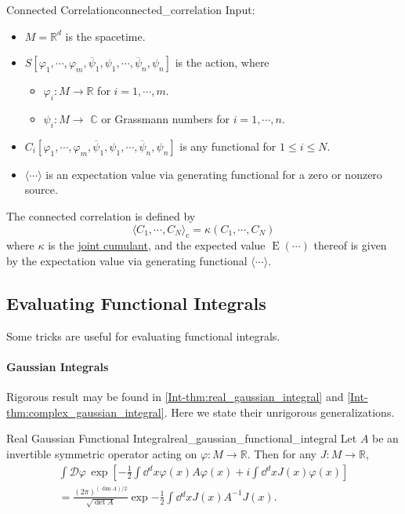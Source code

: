 \documentclass{article}
\begin{document}
\begin{definition}{Connected Correlation}{connected_correlation}
    Input:
    \begin{itemize}[nosep]
        \item $M = \mathbb{R}^{d}$ is the spacetime.
        \item $S[\varphi_1, \cdots, \varphi_m, \overline{\psi}_1,\psi_1,\cdots,\overline{\psi}_n,\psi_n]$ is the action, where
        \begin{itemize}[nosep]
            \item $\varphi_i: M \rightarrow \mathbb{R}$ for $i = 1,\cdots,m$.
            \item $\psi_i: M \rightarrow$ $\mathbb{C}$ or Grassmann numbers for $i = 1,\cdots, n$.
        \end{itemize}
        \item $C_i[\varphi_1, \cdots, \varphi_m, \overline{\psi}_1,\psi_1,\cdots,\overline{\psi}_n,\psi_n]$ is any functional for $1\le i \le N$.
        \item $\langle \cdots \rangle$ is an expectation value via generating functional for a zero or nonzero source.
    \end{itemize}
    The connected correlation is defined by
    \[ \langle C_1, \cdots, C_N \rangle_{\mathrm{c}} = \kappa(C_1,\cdots,C_N) \]
    where $\kappa$ is the \href{https://en.wikipedia.org/wiki/Cumulant#Joint_cumulants}{joint cumulant}, and the expected value $\operatorname{E}({\cdots})$ thereof is given by the expectation value via generating functional $\langle {\cdots} \rangle$.
\end{definition}

\subsection{Evaluating Functional Integrals}

Some tricks are useful for evaluating functional integrals.

\paragraph*{Gaussian Integrals}
Rigorous result may be found in \cref{Int-thm:real_gaussian_integral} and \cref{Int-thm:complex_gaussian_integral}.
Here we state their unrigorous generalizations.

\begin{theorem}{Real Gaussian Functional Integral}{real_gaussian_functional_integral}
Let $A$ be an invertible symmetric operator acting on $\varphi: M\rightarrow \mathbb{R}$.
Then for any $J: M\rightarrow \mathbb{R}$,
\begin{gather*}
    \int \mathcal{D}\varphi\, \exp[-\frac{1}{2}\int \dd{^d x} \varphi(x) A\varphi(x) + i \int \dd{^d x} J(x)\varphi(x)] \\
    = \frac{(2\pi)^{(\dim A)/2}}{\sqrt{\det A}} \exp{-\frac{1}{2}\int \dd{^d x} J(x) A^{-1}J(x)}.
\end{gather*}
\end{theorem}
\end{document}
